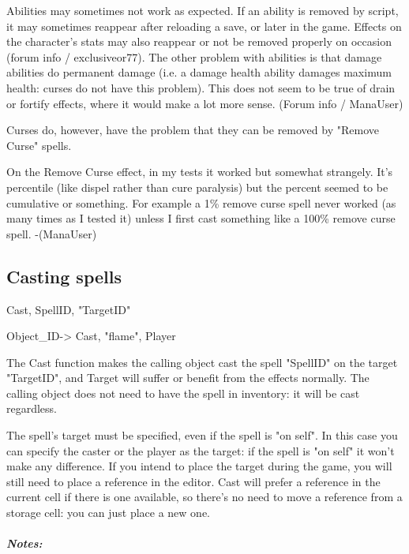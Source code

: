 Abilities may sometimes not work as expected. If an ability is removed
by script, it may sometimes reappear after reloading a save, or later in
the game. Effects on the character's stats may also reappear or not be
removed properly on occasion (forum info / exclusiveor77). The other
problem with abilities is that damage abilities do permanent damage
(i.e. a damage health ability damages maximum health: curses do not have
this problem). This does not seem to be true of drain or fortify
effects, where it would make a lot more sense. (Forum info / ManaUser)

Curses do, however, have the problem that they can be removed by "Remove
Curse" spells.

On the Remove Curse effect, in my tests it worked but somewhat
strangely. It's percentile (like dispel rather than cure paralysis) but
the percent seemed to be cumulative or something. For example a 1\%
remove curse spell never worked (as many times as I tested it) unless I
first cast something like a 100\% remove curse spell. -(ManaUser)

\hypertarget{casting-spells}{%
\subsection{\texorpdfstring{\hfill\break
Casting spells}{ Casting spells}}\label{casting-spells}}

Cast, SpellID, "TargetID"

Object\_ID-> Cast, "flame", Player

The Cast function makes the calling object cast the spell "SpellID" on
the target "TargetID", and Target will suffer or benefit from the
effects normally. The calling object does not need to have the spell in
inventory: it will be cast regardless.

The spell's target must be specified, even if the spell is "on self". In
this case you can specify the caster or the player as the target: if the
spell is "on self" it won't make any difference. If you intend to place
the target during the game, you will still need to place a reference in
the editor. Cast will prefer a reference in the current cell if there is
one available, so there's no need to move a reference from a storage
cell: you can just place a new one.

\hypertarget{notes}{%
\subparagraph{Notes:}\label{notes}}

